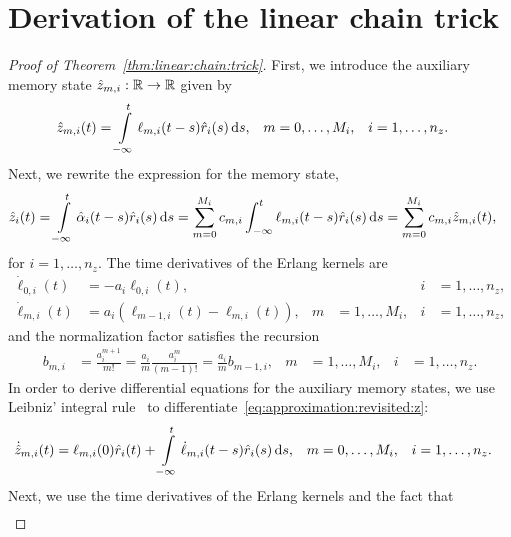 \section{Derivation of the linear chain trick}\label{sec:deriv}
%
\begin{proof}[Proof of Theorem~\ref{thm:linear:chain:trick}]
	First, we introduce the auxiliary memory state $\hat z_{m, i}: \mathbb{R} \rightarrow \mathbb{R}$ given by
	\begin{align}\label{eq:approximation:revisited:z}
		\hat z_{m, i}(t) &= \int\limits_{-\infty}^t \ell_{m, i}(t - s) \hat r_i(s) \,\mathrm{d} s, & m &= 0, \ldots, M_i, & i &= 1, \ldots, n_z.
	\end{align}
	Next, we rewrite the expression for the memory state,
	\begin{align}\label{eq:approximation:z}
		\hat z_i(t) &= \int\limits_{-\infty}^t \hat \alpha_i(t - s) \hat r_i(s) \,\mathrm{d} s = \sum_{m=0}^{M_i} c_{m, i} \int_{-\infty}^t \ell_{m, i}(t - s) \hat r_i(s) \,\mathrm{d} s = \sum_{m=0}^{M_i} c_{m, i} \hat z_{m, i}(t),
	\end{align}
	for $i = 1, \ldots, n_z$. The time derivatives of the Erlang kernels are
	\begin{subequations}\label{eq:erlang:pdf:derivative}
		\begin{align}
			\dot{\ell}_{0, i}(t) &= -a_i \ell_{0, i}(t), &&& i &= 1, \ldots, n_z, \\
			\dot{\ell}_{m, i}(t)
			&= a_i (\ell_{m-1, i}(t) - \ell_{m, i}(t)), & m &= 1, \ldots, M_i, & i &= 1, \ldots, n_z,
		\end{align}
	\end{subequations}
	and the normalization factor satisfies the recursion
	\begin{align}
		b_{m, i} &= \frac{a_i^{m+1}}{m!} = \frac{a_i}{m} \frac{a_i^m}{(m-1)!} = \frac{a_i}{m} b_{m-1, i}, & m &= 1, \ldots, M_i, & i &= 1, \ldots, n_z.
	\end{align}
	In order to derive differential equations for the auxiliary memory states, we use Leibniz' integral rule~\cite[Thm.~3, Chap.~8]{Protter:Morrey:1985} to differentiate~\eqref{eq:approximation:revisited:z}:
	\begin{align}
		\dot{\hat z}_{m, i}(t)
		&= \ell_{m, i}(0) \hat r_i(t) + \int\limits_{-\infty}^t \dot{\ell}_{m, i}(t - s) \hat r_i(s) \,\mathrm{d} s, & m &= 0, \ldots, M_i, & i &= 1, \ldots, n_z.
	\end{align}
	Next, we use the time derivatives of the Erlang kernels and the fact that
	\begin{align}

\end{align}
\end{proof}
